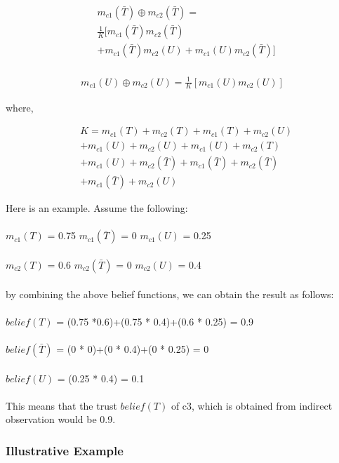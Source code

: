 \documentclass[preprint]{elsarticle}
\theoremstyle{definition}
\theoremstyle{remark}
\theoremstyle{property}
\begin{document}
\begin{equation}
\begin{aligned}
&m_{c1}(\bar{T})\oplus m_{c2}(\bar{T}) = \\
&\frac{1}{K}[m_{c1}(\bar{T})m_{c2}(\bar{T})\\
&+m_{c1}(\bar{T})m_{c2}(U)+m_{c1}(U)m_{c2}(\bar{T})] \\
\end{aligned}
\end{equation}

\begin{equation}
\begin{aligned}
m_{c1}(U)\oplus m_{c2}(U) =
\frac{1}{K}[m_{c1}(U)m_{c2}(U)]
\end{aligned}
\end{equation}

where,

\begin{equation}
\begin{aligned}
&K = m_{c1}(T)+m_{c2}(T)+m_{c1}(T)+m_{c2}(U)\\
&+m_{c1}(U)+m_{c2}(U)+m_{c1}(U)+m_{c2}(T)\\
&+m_{c1}(U)+m_{c2}(\bar{T})+m_{c1}(\bar{T})+m_{c2}(\bar{T})\\
&+m_{c1}(\bar{T})+m_{c2}(U)
\end{aligned}
\end{equation}

Here is an example. Assume the following:\\\\
$m_{c1}(T)$ = 0.75 $m_{c1}(\bar{T})$ = 0 $m_{c1}(U)$ = 0.25\\\\
$m_{c2}(T)$ = 0.6 $m_{c2}(\bar{T})$ = 0 $m_{c2}(U)$ = 0.4\\\\
by combining the above belief functions, we can obtain the result as follows:\\\\
$belief(T)$ = (0.75 *0.6)+(0.75 * 0.4)+(0.6 * 0.25) = 0.9\\\\
$belief(\bar{T})$ = (0 * 0)+(0 * 0.4)+(0 * 0.25) = 0\\\\
$belief(U)$ = (0.25 * 0.4) = 0.1\\\\
This means that the trust $belief(T)$ of c3, which is obtained from indirect
observation would be 0.9.

\subsubsection{Illustrative Example}
\end{document}
